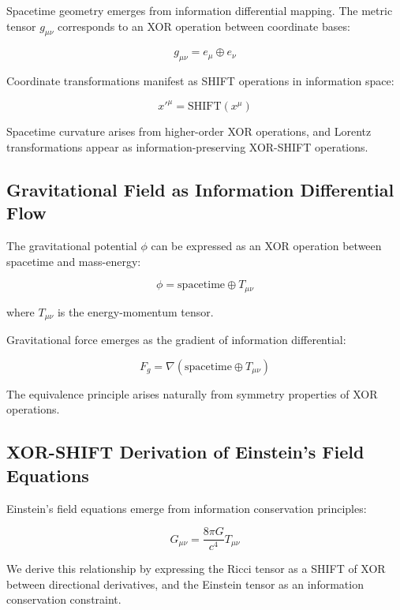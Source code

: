 \documentclass[aps,prl,preprint,superscriptaddress,showpacs]{revtex4-2}
\newcommand{\xor}{\oplus}
\newcommand{\shift}{\text{SHIFT}}
\begin{document}
Spacetime geometry emerges from information differential mapping. The metric tensor $g_{\mu\nu}$ corresponds to an XOR operation between coordinate bases:

\begin{equation}
g_{\mu\nu} = e_{\mu} \xor e_{\nu}
\end{equation}

Coordinate transformations manifest as SHIFT operations in information space:

\begin{equation}
x'^{\mu} = \shift(x^{\mu})
\end{equation}

Spacetime curvature arises from higher-order XOR operations, and Lorentz transformations appear as information-preserving XOR-SHIFT operations.

\subsection{Gravitational Field as Information Differential Flow}

The gravitational potential $\phi$ can be expressed as an XOR operation between spacetime and mass-energy:

\begin{equation}
\phi = \text{spacetime} \xor T_{\mu\nu}
\end{equation}

where $T_{\mu\nu}$ is the energy-momentum tensor.

Gravitational force emerges as the gradient of information differential:

\begin{equation}
F_g = \nabla(\text{spacetime} \xor T_{\mu\nu})
\end{equation}

The equivalence principle arises naturally from symmetry properties of XOR operations.

\subsection{XOR-SHIFT Derivation of Einstein's Field Equations}

Einstein's field equations emerge from information conservation principles:

\begin{equation}
G_{\mu\nu} = \frac{8\pi G}{c^4} T_{\mu\nu}
\end{equation}

We derive this relationship by expressing the Ricci tensor as a SHIFT of XOR between directional derivatives, and the Einstein tensor as an information conservation constraint.
\end{document}
